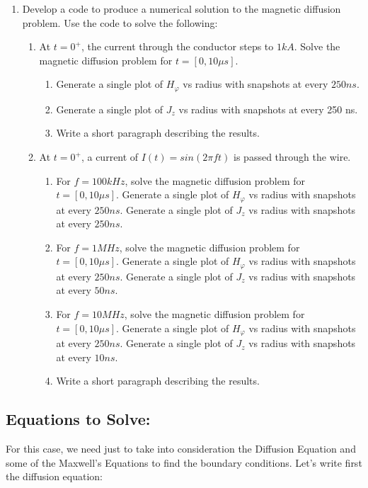 \documentclass{article}
\begin{document}
\begin{enumerate}
\item Develop a code to produce a numerical solution to the magnetic diffusion problem. Use the code to solve the following:
\begin{enumerate}
\item At $t=0^+$, the current through the conductor steps to $1 kA$. Solve the magnetic diffusion problem for $t = [0,10 \mu s]$.
\begin{enumerate}
\item Generate a single plot of $H_\varphi$ vs radius with snapshots at every $250 ns$.
\item Generate a single plot of $J_z$ vs radius with snapshots at every 250 ns. 
\item Write a short paragraph describing the results. 
\end{enumerate}
\item  At $t=0^+$, a current of $I(t) = sin(2\pi f t)$ is passed through the wire.
\begin{enumerate}
\item For $f = 100kHz$, solve the magnetic diffusion problem for $t = [0,10\mu s]$. Generate a single plot of $H_\varphi$ vs radius with snapshots at every $250 ns$. Generate a single plot of $J_z$ vs radius with snapshots at every $250 ns$. 

\item For $f = 1MHz$, solve the magnetic diffusion problem for $t = [0,10\mu s]$. Generate a single plot of $H_\varphi$ vs radius with snapshots at every $250 ns$. Generate a single plot of $J_z$ vs radius with snapshots at every $50 ns$. 

\item For $f = 10MHz$, solve the magnetic diffusion problem for $t = [0,10\mu s]$. Generate a single plot of $H_\varphi$ vs radius with snapshots at every $250 ns$. Generate a single plot of $J_z$ vs radius with snapshots at every $10 ns$. 
\item Write a short paragraph describing the results. 
\end{enumerate}
\end{enumerate}
\end{enumerate}

\subsection{Equations to Solve:}

For this case, we need just to take into consideration the Diffusion Equation and some of the Maxwell's Equations to find the boundary conditions. Let's write first the diffusion equation:
\end{document}

